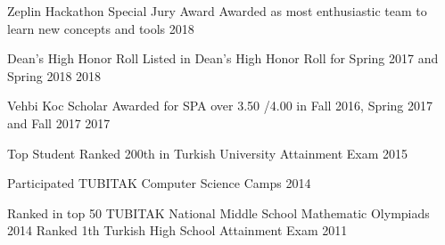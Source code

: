 

\cvsubsection{ }

\begin{cvhonors}
  \cvhonor
    {Zeplin Hackathon Special Jury Award} %
    {Awarded as most enthusiastic team to learn new concepts and tools} %
    {} %
    {2018} %

  \cvhonor
    {Dean’s High Honor Roll } %
    {Listed in Dean's High Honor Roll for Spring 2017 and Spring 2018} %
    {} %
    {2018} %

  \cvhonor
    {Vehbi Koc Scholar} %
    {Awarded for SPA over 3.50 /4.00 in Fall 2016, Spring 2017 and Fall 2017} %
    {} %
    {2017} %

  \cvhonor
    {Top Student} %
    {Ranked 200th in Turkish University Attainment Exam} %
    {} %
    {2015} %

  \cvhonor
    {Participated} %
    {TUBITAK Computer Science Camps} %
    {} %
    {2014} %

  \cvhonor
    {Ranked in top 50} %
    {TUBITAK National Middle School Mathematic Olympiads} %
    {} %
    {2014} %
  \cvhonor
    {Ranked 1th} %
    {Turkish High School Attainment Exam} %
    {} %
    {2011} %


\end{cvhonors}



